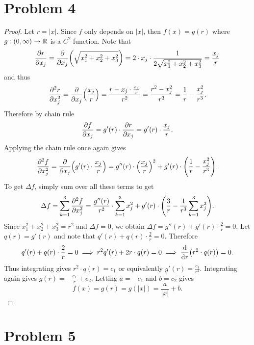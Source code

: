 \documentclass{eeleyes}
\begin{document}
\section*{Problem 4}
\begin{proof}
    Let $r = |x|$. Since $f$ only depends on $|x|$, then $f(x) = g(r)$ where $g : (0, \infty) \to \mathbb{R}$ is a $C^2$ function. Note that
    \[
        \pdv{r}{x_j} = \pdv{x_j} \qty(\sqrt{x_1^2 + x_2^2 + x_3^2}) = 2 \cdot x_{j} \cdot \frac{1}{2\sqrt{x_1^2 + x_2^2 + x_3^2}} = \frac{x_j}{r}
    \]
    and thus
    \[
        \pdv[2]{r}{x_j} = \pdv{x_j} \qty(\frac{x_j}{r}) = \frac{r - x_j \cdot \frac{x_j}{r}}{r^2} = \frac{r^2 - x_j^2}{r^3} = \frac{1}{r} - \frac{x_j^2}{r^3}
    .\]
    Therefore by chain rule
    \[
        \pdv{f}{x_j} = g'(r) \cdot \pdv{r}{x_j} = g'(r) \cdot \frac{x_j}{r}
    .\]
    Applying the chain rule once again gives
    \[
        \pdv[2]{f}{x_j} = \pdv{x_j} \qty(g'(r) \cdot \frac{x_j}{r}) = g''(r) \cdot \qty(\frac{x_j}{r})^2 + g'(r) \cdot \qty(\frac{1}{r} - \frac{x_j^2}{r^3})
    .\]
    To get $\Delta f$, simply sum over all these terms to get
    \[
        \Delta f = \sum_{k = 1}^3 \pdv[2]{f}{x_j} = \frac{g''(r)}{r^2} \cdot \sum_{k = 1}^3 x_j^2 + g'(r) \cdot \qty(\frac{3}{r} - \frac{1}{r^3} \sum_{k=1}^3 x_j^2)
    .\]
    Since $x_1^2 + x_2^2 + x_3^2 = r^2$ and $\Delta f = 0$, we obtain $\Delta f = g''(r) + g'(r) \cdot \frac{2}{r} = 0$. Let $q(r) = g'(r)$ and note that $q'(r) + q(r) \cdot \frac{2}{r} = 0$. Therefore
    \[
        q'(r) + q(r) \cdot \frac{2}{r} = 0 \implies r^2 q'(r) + 2r \cdot q(r) = 0 \implies \dv{r} \qty(r^2 \cdot q(r)) = 0
    .\]
    Thus integrating gives $r^2 \cdot q(r) = c_1$ or equivalently $g'(r) = \frac{c_1}{r^2}$. Integrating again gives $g(r) = -\frac{c_1}{r} + c_2$. Letting $a = -c_1$ and $b = c_2$ gives
    \[
        f(x) = g(r) = g(|x|) = \frac{a}{|x|} + b
    .\]
\end{proof}

\section*{Problem 5}
\end{document}
